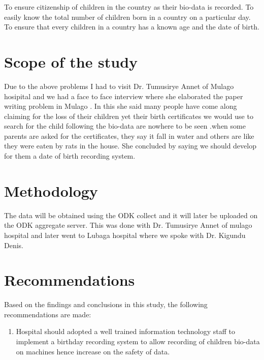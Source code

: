 \documentclass[12pt,]{article}
\begin{document}
To ensure citizenship of children in the country as their bio-data is recorded.
To easily know the total number of children born in a country on a particular day.
To  ensure that every children in a country has a known age and the date of birth.


\section{Scope of the study}
Due to the above problems I had to visit Dr. Tumusirye Annet of Mulago hosipital and we had a face to face interview where she elaborated the paper writing problem in Mulago . In this she said many people have come along claiming for the loss of their children yet their birth certificates we would use to search for the child following the bio-data are nowhere to be seen .when some parents are asked for the certificates, they say  it fall in water and others are like they were eaten by rats in the house. She concluded by saying we should develop for them a date of birth recording system.

\section{Methodology}
The data will be obtained using the ODK collect and it will later be uploaded on the ODK aggregate server.
This was done with Dr. Tumusirye Annet of mulago hospital and later went to Lubaga hospital where we spoke with Dr. Kigundu Denis.
\section{Recommendations }
Based on the findings and conclusions in this study, the following recommendations are made:

\begin{enumerate}

\item Hospital should adopted a well trained information technology staff to implement a birthday recording system to allow recording of children bio-data on machines hence increase on the safety of data.






\end{enumerate}
\end{document}
